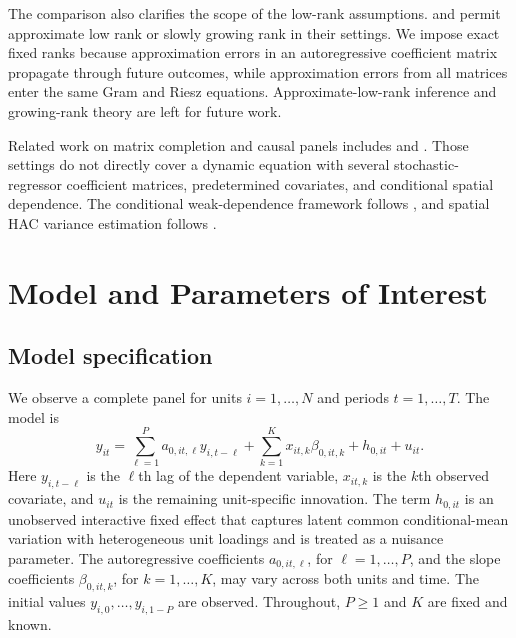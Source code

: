 \documentclass[11pt]{article}
\numberwithin{equation}{section}
\theoremstyle{remark}
\begin{document}
The comparison also clarifies the scope of the low-rank assumptions. \citet{chernozhukov2023} and \citet{choi2024} permit approximate low rank or slowly growing rank in their settings. We impose exact fixed ranks because approximation errors in an autoregressive coefficient matrix propagate through future outcomes, while approximation errors from all matrices enter the same Gram and Riesz equations. Approximate-low-rank inference and growing-rank theory are left for future work.

Related work on matrix completion and causal panels includes \citet{athey2021matrix} and \citet{bai_ng2021matrix}. Those settings do not directly cover a dynamic equation with several stochastic-regressor coefficient matrices, predetermined covariates, and conditional spatial dependence. The conditional weak-dependence framework follows \citet{jenishprucha2012}, and spatial HAC variance estimation follows \citet{conley1999gmm}.

\section{Model and Parameters of Interest}
\label{sec:model}

\subsection{Model specification}

We observe a complete panel for units $i=1,\ldots,N$ and periods $t=1,\ldots,T$. The model is
\begin{equation}
\label{eq:model}
y_{it}
=
\sum_{\ell=1}^{P}a_{0,it,\ell}y_{i,t-\ell}
+
\sum_{k=1}^{K}x_{it,k}\beta_{0,it,k}
+
h_{0,it}
+
u_{it}.
\end{equation}
Here $y_{i,t-\ell}$ is the $\ell$th lag of the dependent variable, $x_{it,k}$ is the $k$th observed covariate, and $u_{it}$ is the remaining unit-specific innovation. The term $h_{0,it}$ is an unobserved interactive fixed effect that captures latent common conditional-mean variation with heterogeneous unit loadings and is treated as a nuisance parameter. The autoregressive coefficients $a_{0,it,\ell}$, for $\ell=1,\ldots,P$, and the slope coefficients $\beta_{0,it,k}$, for $k=1,\ldots,K$, may vary across both units and time. The initial values $y_{i,0},\ldots,y_{i,1-P}$ are observed. Throughout, $P\ge1$ and $K$ are fixed and known.
\end{document}
